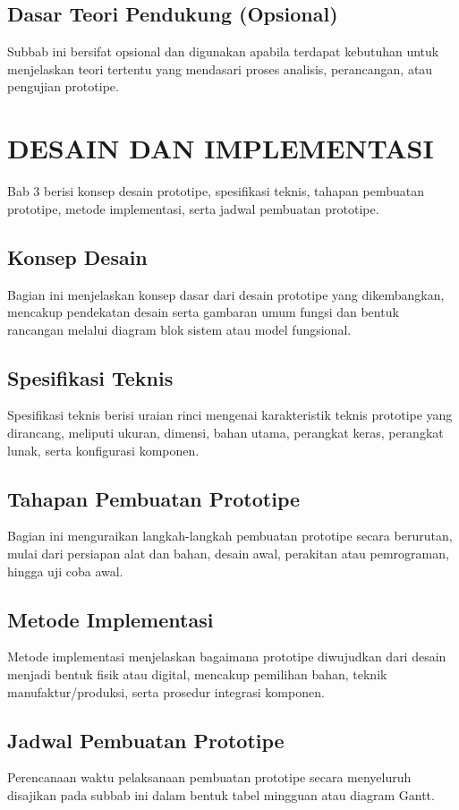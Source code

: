 \documentclass[prototipe,laporan]{itkta2025}
\begin{document}
\section{Dasar Teori Pendukung (Opsional)}
Subbab ini bersifat opsional dan digunakan apabila terdapat kebutuhan untuk menjelaskan teori tertentu yang mendasari proses analisis, perancangan, atau pengujian prototipe.

\chapter{DESAIN DAN IMPLEMENTASI}
Bab 3 berisi konsep desain prototipe, spesifikasi teknis, tahapan pembuatan prototipe, metode implementasi, serta jadwal pembuatan prototipe.

\section{Konsep Desain}
Bagian ini menjelaskan konsep dasar dari desain prototipe yang dikembangkan, mencakup pendekatan desain serta gambaran umum fungsi dan bentuk rancangan melalui diagram blok sistem atau model fungsional.

\section{Spesifikasi Teknis}
Spesifikasi teknis berisi uraian rinci mengenai karakteristik teknis prototipe yang dirancang, meliputi ukuran, dimensi, bahan utama, perangkat keras, perangkat lunak, serta konfigurasi komponen.

\section{Tahapan Pembuatan Prototipe}
Bagian ini menguraikan langkah-langkah pembuatan prototipe secara berurutan, mulai dari persiapan alat dan bahan, desain awal, perakitan atau pemrograman, hingga uji coba awal.

\section{Metode Implementasi}
Metode implementasi menjelaskan bagaimana prototipe diwujudkan dari desain menjadi bentuk fisik atau digital, mencakup pemilihan bahan, teknik manufaktur/produksi, serta prosedur integrasi komponen.

\section{Jadwal Pembuatan Prototipe}
Perencanaan waktu pelaksanaan pembuatan prototipe secara menyeluruh disajikan pada subbab ini dalam bentuk tabel mingguan atau diagram Gantt.
\end{document}
